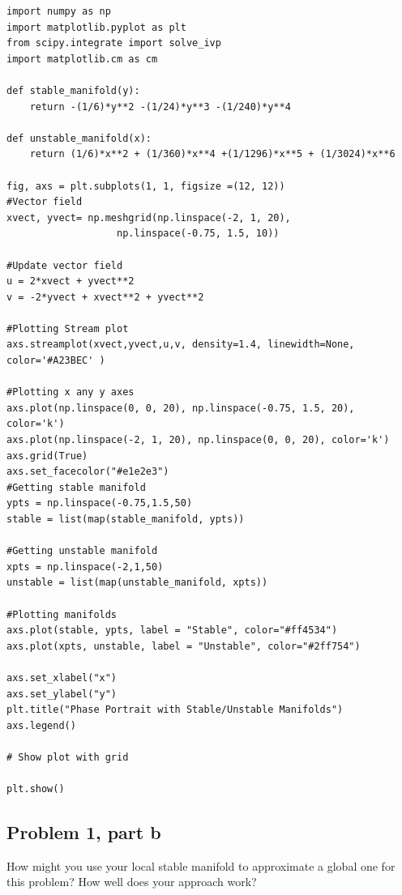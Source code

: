 \begin{solution}
\clearpage
\begin{lstlisting}
import numpy as np
import matplotlib.pyplot as plt 
from scipy.integrate import solve_ivp
import matplotlib.cm as cm

def stable_manifold(y):
    return -(1/6)*y**2 -(1/24)*y**3 -(1/240)*y**4

def unstable_manifold(x):
    return (1/6)*x**2 + (1/360)*x**4 +(1/1296)*x**5 + (1/3024)*x**6

fig, axs = plt.subplots(1, 1, figsize =(12, 12))
#Vector field
xvect, yvect= np.meshgrid(np.linspace(-2, 1, 20),  
                   np.linspace(-0.75, 1.5, 10)) 

#Update vector field
u = 2*xvect + yvect**2
v = -2*yvect + xvect**2 + yvect**2

#Plotting Stream plot
axs.streamplot(xvect,yvect,u,v, density=1.4, linewidth=None, color='#A23BEC' ) 

#Plotting x any y axes
axs.plot(np.linspace(0, 0, 20), np.linspace(-0.75, 1.5, 20), color='k')
axs.plot(np.linspace(-2, 1, 20), np.linspace(0, 0, 20), color='k')
axs.grid(True)
axs.set_facecolor("#e1e2e3")
#Getting stable manifold
ypts = np.linspace(-0.75,1.5,50) 
stable = list(map(stable_manifold, ypts))

#Getting unstable manifold
xpts = np.linspace(-2,1,50) 
unstable = list(map(unstable_manifold, xpts))

#Plotting manifolds
axs.plot(stable, ypts, label = "Stable", color="#ff4534")
axs.plot(xpts, unstable, label = "Unstable", color="#2ff754")

axs.set_xlabel("x")
axs.set_ylabel("y")
plt.title("Phase Portrait with Stable/Unstable Manifolds")
axs.legend()

# Show plot with grid 
 
plt.show() 
\end{lstlisting}
\end{solution}

\newpage
\subsection{Problem 1, part b}
How might you use your local stable manifold to approximate a global one for this problem? How well does your approach work?

